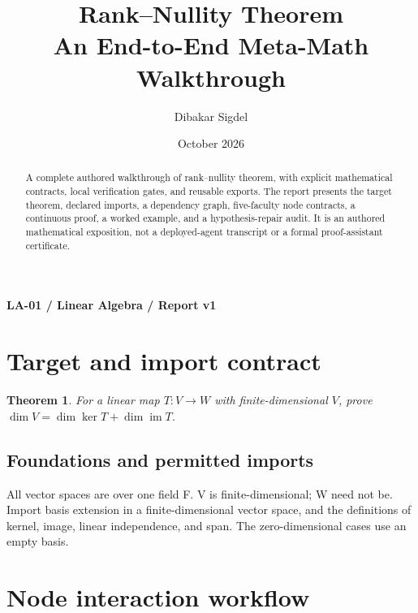 \documentclass[preprint,12pt,aps,pra,showkeys,amsmath,amssymb,superscriptaddress,floatfix]{revtex4-2}
\newtheorem{theorem}{Theorem}[section]
\theoremstyle{definition}
\theoremstyle{remark}
\begin{document}
\title{Rank--Nullity Theorem\\[4pt]\large An End-to-End Meta-Math Walkthrough}

\author{Dibakar Sigdel}


\date{October 2026}

\begin{abstract}

A complete authored walkthrough of rank--nullity theorem, with explicit
mathematical contracts, local verification gates, and reusable exports.
The report presents the target theorem, declared imports, a dependency
graph, five-faculty node contracts, a continuous proof, a worked
example, and a hypothesis-repair audit. It is an authored mathematical
exposition, not a deployed-agent transcript or a formal proof-assistant
certificate.

\end{abstract}\maketitle\linespread{1.12}\selectfont

\noindent\textbf{LA-01 / Linear Algebra / Report v1}

\section{Target and import contract}

\begin{theorem}

For a linear map \(T:V\to W\) with finite-dimensional \(V\), prove
\(\dim V=\dim\ker T+\dim\operatorname{im}T\).

\end{theorem}

\subsection{Foundations and permitted imports}

All vector spaces are over one field F. V is finite-dimensional; W need
not be. Import basis extension in a finite-dimensional vector space, and
the definitions of kernel, image, linear independence, and span. The
zero-dimensional cases use an empty basis.

\clearpage\section{Node interaction workflow}
\end{document}

